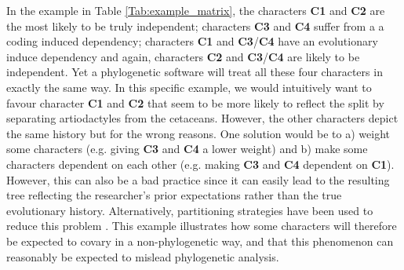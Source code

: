 \documentclass[12pt,letterpaper]{article}
\begin{document}
In the example in Table \ref{Tab:example_matrix}, the characters \textbf{C1} and \textbf{C2} are the most likely to be truly independent; characters \textbf{C3} and \textbf{C4} suffer from a a coding induced dependency; characters \textbf{C1} and \textbf{C3}/\textbf{C4} have an evolutionary induce dependency and again, characters \textbf{C2} and \textbf{C3}/\textbf{C4} are likely to be independent.
Yet a phylogenetic software will treat all these four characters in exactly the same way.
In this specific example, we would intuitively want to favour character \textbf{C1} and \textbf{C2} that seem to be more likely to reflect the split by separating artiodactyles from the cetaceans.
However, the other characters depict the same history %
 but for the wrong reasons. %
One solution would be to a) weight some characters (e.g. giving \textbf{C3} and \textbf{C4} a lower weight) and b) make some characters dependent on each other (e.g. making \textbf{C3} and \textbf{C4} dependent on \textbf{C1}).
However, this can also be a bad practice since it can easily lead to the resulting tree reflecting the researcher's prior expectations rather than the true evolutionary history.
Alternatively, partitioning strategies have been used to reduce this problem \citep[see][and references within]{Rosa2019}.
This example illustrates how some characters will therefore be expected to covary in a non-phylogenetic way, and that this phenomenon can reasonably be expected to mislead phylogenetic analysis. %

\end{document}
